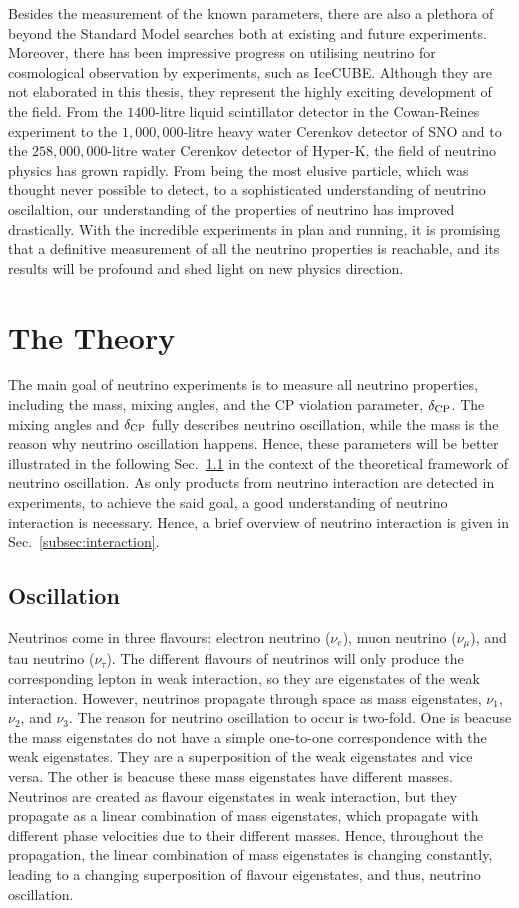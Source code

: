 Besides the measurement of the known parameters, there are also a plethora of beyond the Standard Model searches both at existing and future experiments.
Moreover, there has been impressive progress on utilising neutrino for cosmological observation by experiments, such as IceCUBE.
Although they are not elaborated in this thesis, they represent the highly exciting development of the field.
From the $1400$-litre liquid scintillator detector in the Cowan-Reines experiment to the $1,000,000$-litre heavy water Cerenkov detector of SNO and to the $258,000,000$-litre water Cerenkov detector of Hyper-K, the field of neutrino physics has grown rapidly. 
From being the most elusive particle, which was thought never possible to detect, to a sophisticated understanding of neutrino oscilaltion, our understanding of the properties of neutrino has improved drastically.
With the incredible experiments in plan and running, it is promising that a definitive measurement of all the neutrino properties is reachable, and its results will be profound and shed light on new physics direction.

\section{The Theory}
The main goal of neutrino experiments is to measure all neutrino properties, including the mass, mixing angles, and the CP violation parameter, $\delta_\textrm{CP}$. 
The mixing angles and $\delta_\textrm{CP}$ fully describes neutrino oscillation, while the mass is the reason why neutrino oscillation happens.
Hence, these parameters will be better illustrated in the following Sec.~\ref{subsec:oscillation} in the context of the theoretical framework of neutrino oscillation.
As only products from neutrino interaction are detected in experiments, to achieve the said goal, a good understanding of neutrino interaction is necessary.
Hence, a brief overview of neutrino interaction is given in Sec.~\ref{subsec:interaction}.

\subsection{Oscillation}
\label{subsec:oscillation}
Neutrinos come in three flavours: electron neutrino ($\nu_e$), muon neutrino ($\nu_\mu$), and tau neutrino ($\nu_\tau$).
The different flavours of neutrinos will only produce the corresponding lepton in weak interaction, so they are eigenstates of the weak interaction.
However, neutrinos propagate through space as mass eigenstates, $\nu_1$, $\nu_2$, and $\nu_3$.
The reason for neutrino oscillation to occur is two-fold.
One is beacuse the mass eigenstates do not have a simple one-to-one correspondence with the weak eigenstates. 
They are a superposition of the weak eigenstates and vice versa.
The other is beacuse these mass eigenstates have different masses.
Neutrinos are created as flavour eigenstates in weak interaction, but they propagate as a linear combination of mass eigenstates, which propagate with different phase velocities due to their different masses.
Hence, throughout the propagation, the linear combination of mass eigenstates is changing constantly, leading to a changing superposition of flavour eigenstates, and thus, neutrino oscillation.

